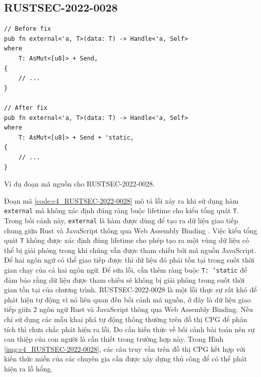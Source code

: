 \subsection{RUSTSEC-2022-0028}

\begin{listing}[H]
\begin{verbatim}
// Before fix
pub fn external<'a, T>(data: T) -> Handle<'a, Self>
where
    T: AsMut<[u8]> + Send,
{
    // ...
}

// After fix
pub fn external<'a, T>(data: T) -> Handle<'a, Self>
where
    T: AsMut<[u8]> + Send + 'static,
{
    // ...
}
\end{verbatim}
\caption{Ví dụ đoạn mã nguồn cho RUSTSEC-2022-0028.}
\label{code:c4_RUSTSEC-2022-0028}
\end{listing}

Đoạn mã \ref{code:c4_RUSTSEC-2022-0028} mô tả lỗi xảy ra khi sử dụng hàm \texttt{external} mà không xác định đúng ràng buộc lifetime cho kiểu tổng quát \texttt{T}.
Trong bối cảnh này, \texttt{external} là hàm được dùng để tạo ra dữ liệu giao tiếp chung giữa Rust và JavaScript thông qua Web Assembly Binding \cite{ githubGitHubRustwasmwasmbindgen}.
Việc kiểu tổng quát \texttt{T} không được xác định đúng lifetime cho phép tạo ra một vùng dữ liệu có thể bị giải phóng trong khi chúng vẫn được tham chiếu bởi mã nguồn JavaScript.
Để hai ngôn ngữ có thể giao tiếp được thì dữ liệu đó phải tồn tại trong suốt thời gian chạy của cả hai ngôn ngữ.
Để sửa lỗi, cần thêm ràng buộc \texttt{T: 'static} để đảm bảo rằng dữ liệu được tham chiếu sẽ không bị giải phóng trong suốt thời gian tồn tại của chương trình.
RUSTSEC-2022-0028 là một lỗi thực sự rất khó để phát hiện tự động vì nó liên quan đến bối cảnh mã nguồn, ở đây là dữ liệu giao tiếp giữa 2 ngôn ngữ Rust và JavaScript thông qua Web Assembly Binding.
Nếu chỉ sử dụng các mẫu khai phá tự động thông thường trên đồ thị CPG để phân tích thì chưa chắc phát hiện ra lỗi.
Do cần kiến thức về bối cảnh bài toán nên sự can thiệp của con người là cần thiết trong trường hợp này.
Trong Hình \ref{img:c4_RUSTSEC-2022-0028}, các câu truy vấn trên đồ thị CPG kết hợp với kiến thức miền của các chuyên gia cần được xây dựng thủ công để có thể phát hiện ra lỗ hổng.

